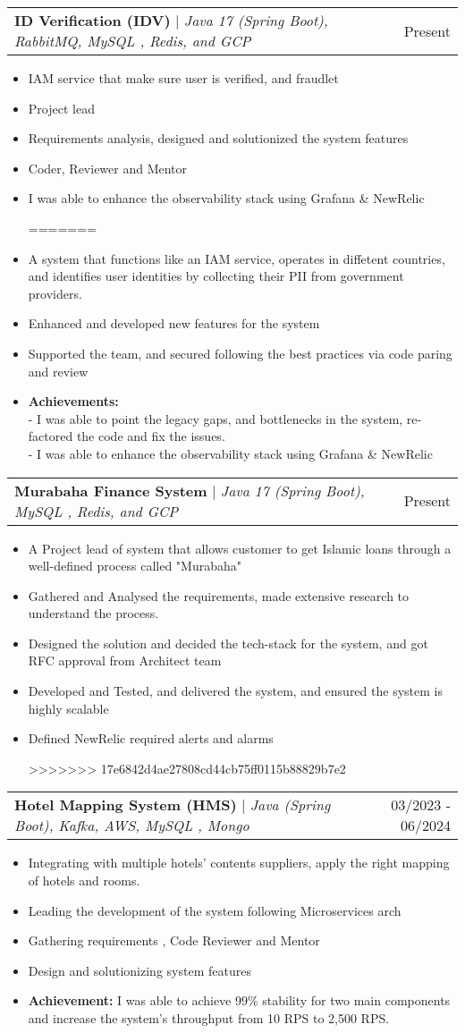 \documentclass[letterpaper,11pt]{article}
\makeatletter
\newcommand{\resumeItem}[1]{
  \item\small{
    {#1 \vspace{-2pt}}
  }
}
\newcommand{\resumeProjectHeading}[2]{
    \item
    \begin{tabular*}{0.97\textwidth}{l@{\extracolsep{\fill}}r}
      \small#1 & #2 \\
    \end{tabular*}\vspace{-7pt}
}
\newcommand{\resumeItemListStart}{\begin{itemize}}
\newcommand{\resumeItemListEnd}{\end{itemize}\vspace{-5pt}}
\makeatother
\begin{document}
          
        \resumeProjectHeading
        {\textbf{ID Verification (IDV)} $|$ \footnotesize\emph{Java 17 (Spring Boot), RabbitMQ, MySQL , Redis, and GCP}}{Present}
        \resumeItemListStart
<<<<<<< HEAD
            \resumeItem{IAM service that make sure user is verified, and fraudlet}
            \resumeItem{Project lead}
            \resumeItem{Requirements analysis, designed and solutionized the system features}
            \resumeItem{Coder, Reviewer and Mentor}
             \resumeItem{ I was able to enhance the observability stack using Grafana \& NewRelic } 
=======
            \resumeItem{A system that functions like an IAM service, operates in diffetent countries, and identifies user identities by collecting their PII from government providers.}
            \resumeItem{Enhanced and developed new features for the system}
            \resumeItem{Supported the team, and secured following the best practices via code paring and review}
            \resumeItem{
            	\textbf{Achievements:}\\
            	- I was able to point the legacy gaps, and bottlenecks in the system, re-factored the code and fix the issues. \\
            	- I was able to enhance the observability stack using Grafana \& NewRelic
            } 
          \resumeItemListEnd
          
        \resumeProjectHeading
        {\textbf{Murabaha Finance System} $|$ \footnotesize\emph{Java 17 (Spring Boot), MySQL , Redis, and GCP}}{Present}
        \resumeItemListStart
            \resumeItem{A Project lead of system that allows customer to get Islamic loans through a well-defined process called "Murabaha"}
            \resumeItem{Gathered and Analysed the requirements, made extensive research to understand the process. }
            \resumeItem{Designed the solution and decided the tech-stack for the system, and got RFC approval from Architect team}
            \resumeItem{Developed and Tested, and delivered the system, and ensured the system is highly scalable}
            \resumeItem{Defined NewRelic required alerts and alarms} 
>>>>>>> 17e6842d4ae27808cd44cb75ff0115b88829b7e2
          \resumeItemListEnd
    
        \resumeProjectHeading
        {\textbf{Hotel Mapping System (HMS)} $|$ \footnotesize\emph{Java (Spring Boot), Kafka, AWS, MySQL , Mongo}}{03/2023 - 06/2024}
        \resumeItemListStart
            \resumeItem{Integrating with multiple hotels' contents suppliers, apply the right mapping of hotels and rooms.}
            \resumeItem{Leading the development of the system following Microservices arch}
            \resumeItem{Gathering requirements , Code Reviewer and Mentor }
            \resumeItem{Design and solutionizing system features}
            \resumeItem{\textbf{Achievement:} I was able to achieve 99\% stability for two main components and increase the system's throughput from 10 RPS to 2,500 RPS. }
          \resumeItemListEnd
          
\end{document}
